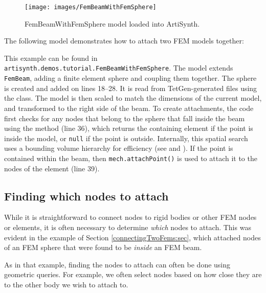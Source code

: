 \begin{figure}[ht]
	\centering
	\texttt{[image: images/FemBeamWithFemSphere]}
	\caption{FemBeamWithFemSphere model loaded into ArtiSynth.}
	\label{fig:fem:beamwithfemsphere}
\end{figure}

The following model demonstrates how to attach two FEM models together:
\lstset{numbers=left}

\lstset{numbers=none}
This example can be found in 
{\tt artisynth.demos.tutorial.FemBeamWithFemSphere}.  The model extends 
{\tt FemBeam}, adding a finite element sphere and coupling them together.
The sphere is created and added on lines 18--28.  It is read from
TetGen-generated files using the 
 class.  The model is then
scaled to match the dimensions of the current model, and transformed to the
right side of the beam.  To create attachments, the code first checks for 
any nodes that belong to the sphere that fall inside the beam using the
method (line 36), which returns the containing element if the point is inside
the model, or {\tt null} if the point is outside.  Internally, this spatial 
search uses a bounding volume hierarchy for efficiency (see 
 and 
).  If the point is contained
within the beam, then {\tt mech.attachPoint()}
is used to attach it to the nodes of the element (line 39).

\subsection{Finding which nodes to attach}

While it is straightforward to connect nodes to rigid bodies or other
FEM nodes or elements, it is often necessary to determine {\it which}
nodes to attach. This was evident in the example of
Section \ref{connectingTwoFems:sec}, which attached nodes of an FEM
sphere that were found to be {\it inside} an FEM beam.

As in that example, finding the nodes to attach can often be done
using geometric queries. For example, we often select nodes based on
how close they are to the other body we wish to attach to.

